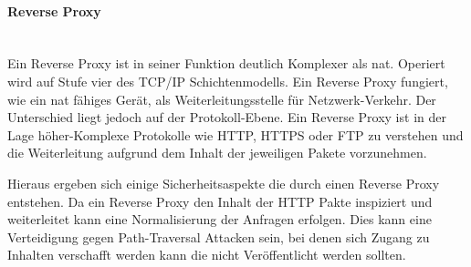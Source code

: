 \paragraph{Reverse Proxy}\ \\
Ein Reverse Proxy ist in seiner Funktion deutlich Komplexer als \ac{nat}.
Operiert wird auf Stufe vier des TCP/IP Schichtenmodells.
Ein Reverse Proxy fungiert, wie ein \ac{nat} fähiges Gerät, als Weiterleitungsstelle für Netzwerk-Verkehr.
Der Unterschied liegt jedoch auf der Protokoll-Ebene.
Ein Reverse Proxy ist in der Lage höher-Komplexe Protokolle wie HTTP, HTTPS oder FTP zu verstehen und die Weiterleitung aufgrund dem Inhalt der jeweiligen Pakete vorzunehmen.

Hieraus ergeben sich einige Sicherheitsaspekte die durch einen Reverse Proxy entstehen.
Da ein Reverse Proxy den Inhalt der HTTP Pakte inspiziert und weiterleitet kann eine Normalisierung der Anfragen erfolgen.
Dies kann eine Verteidigung gegen Path-Traversal Attacken sein, bei denen sich Zugang zu Inhalten verschafft werden kann die nicht Veröffentlicht werden sollten.

\pagebreak